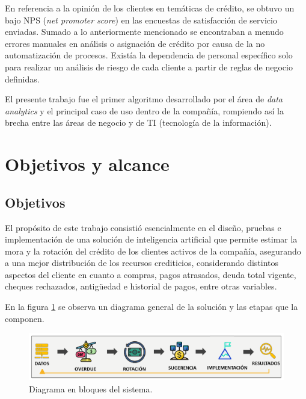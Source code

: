 En referencia a la opinión de los clientes en temáticas de crédito, se obtuvo un bajo NPS (\textit{net promoter score}) en las encuestas de satisfacción de servicio enviadas.
Sumado a lo anteriormente mencionado se encontraban a menudo errores manuales en análisis o asignación de crédito  por causa de la no automatización de procesos. Existía la dependencia de personal específico solo para realizar un análisis de riesgo de cada cliente a partir de reglas de negocio definidas.

El presente trabajo fue el primer algoritmo desarrollado por el área de \textit{data analytics} y el principal caso de uso dentro de la compañía, rompiendo así la brecha entre las áreas de negocio y de TI (tecnología de la información).



\section{Objetivos y alcance}

\subsection{Objetivos}

El propósito de este trabajo consistió esencialmente en el diseño, pruebas e implementación de una solución de inteligencia artificial que permite estimar la mora
y la rotación del crédito de los clientes activos de la compañía, asegurando a una mejor distribución de los recursos crediticios, considerando distintos aspectos del cliente en cuanto a compras, pagos atrasados, deuda total vigente, cheques rechazados, antigüedad e historial de pagos, entre otras variables.

En la figura \ref{fig:Diagrama en bloques del sistema}  se observa un diagrama general de la solución y las etapas que la componen.

\vspace{1cm}
\begin{figure}[htbp]
	\centering
	\includegraphics[width=1.0\textwidth]{./Figures/Diagrama de FlujoV2.png}
	\caption{Diagrama en bloques del sistema.}
	\label{fig:Diagrama en bloques del sistema}
\end{figure}
\vspace{1cm}

